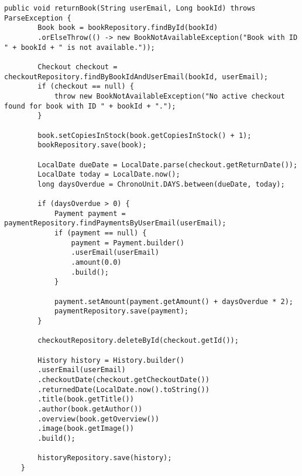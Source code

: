 \begin{lstlisting}[style=pseudocode, caption=Die Geschäftslogik der Rückgabe eines Buches im Backend, label=returnBook().java, breaklines=true]
	public void returnBook(String userEmail, Long bookId) throws ParseException {
		Book book = bookRepository.findById(bookId)
		.orElseThrow(() -> new BookNotAvailableException("Book with ID " + bookId + " is not available."));
		
		Checkout checkout = checkoutRepository.findByBookIdAndUserEmail(bookId, userEmail);
		if (checkout == null) {
			throw new BookNotAvailableException("No active checkout found for book with ID " + bookId + ".");
		}
		
		book.setCopiesInStock(book.getCopiesInStock() + 1);
		bookRepository.save(book);
		
		LocalDate dueDate = LocalDate.parse(checkout.getReturnDate());
		LocalDate today = LocalDate.now();
		long daysOverdue = ChronoUnit.DAYS.between(dueDate, today);
		
		if (daysOverdue > 0) {
			Payment payment = paymentRepository.findPaymentsByUserEmail(userEmail);
			if (payment == null) {
				payment = Payment.builder()
				.userEmail(userEmail)
				.amount(0.0)
				.build();
			}
			
			payment.setAmount(payment.getAmount() + daysOverdue * 2);
			paymentRepository.save(payment);
		}
		
		checkoutRepository.deleteById(checkout.getId());
		
		History history = History.builder()
		.userEmail(userEmail)
		.checkoutDate(checkout.getCheckoutDate())
		.returnedDate(LocalDate.now().toString())
		.title(book.getTitle())
		.author(book.getAuthor())
		.overview(book.getOverview())
		.image(book.getImage())
		.build();
		
		historyRepository.save(history);
	}
\end{lstlisting}